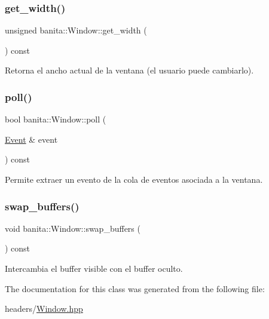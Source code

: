 \subsubsection{\texorpdfstring{get\_width()}{get\_width()}}
{\footnotesize\ttfamily unsigned banita\+::\+Window\+::get\+\_\+width (\begin{DoxyParamCaption}{ }\end{DoxyParamCaption}) const}

Retorna el ancho actual de la ventana (el usuario puede cambiarlo). \mbox{\label{classbanita_1_1_window_aee3634f0202d871a8fb9cf477cf23a15}} 
\subsubsection{\texorpdfstring{poll()}{poll()}}
{\footnotesize\ttfamily bool banita\+::\+Window\+::poll (\begin{DoxyParamCaption}\item[{\mbox{\hyperlink{structbanita_1_1_window_1_1_event}{Event}} \&}]{event }\end{DoxyParamCaption}) const}

Permite extraer un evento de la cola de eventos asociada a la ventana. \mbox{\label{classbanita_1_1_window_a87aa2169094bc025281540a81cfc96a8}} 
\subsubsection{\texorpdfstring{swap\_buffers()}{swap\_buffers()}}
{\footnotesize\ttfamily void banita\+::\+Window\+::swap\+\_\+buffers (\begin{DoxyParamCaption}{ }\end{DoxyParamCaption}) const}

Intercambia el buffer visible con el buffer oculto. 

The documentation for this class was generated from the following file\+:\begin{DoxyCompactItemize}
\item 
headers/\mbox{\hyperlink{_window_8hpp}{Window.\+hpp}}\end{DoxyCompactItemize}
